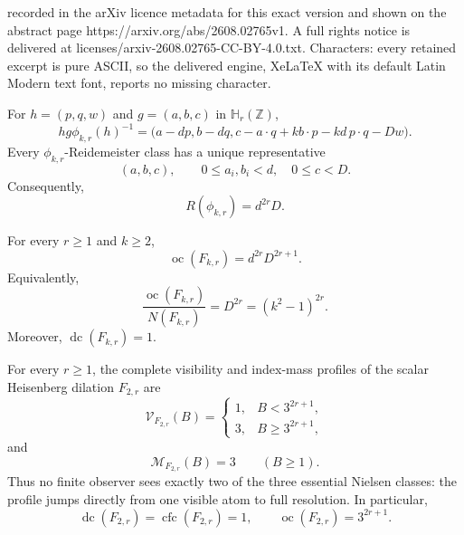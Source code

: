 \documentclass[10pt,a4paper]{amsart}
\DeclareMathOperator{\cfc}{cfc}
\DeclareMathOperator{\dc}{dc}
\DeclareMathOperator{\oc}{oc}
\newcommand{\Heis}{\mathbb H}
\newcommand{\MN}{\mathcal M}
\newcommand{\VN}{\mathcal V}
\newcommand{\Z}{\mathbb Z}
\begin{document}
recorded in the arXiv licence metadata for this exact version and shown on the abstract page https://arxiv.org/abs/2608.02765v1. A full rights notice is delivered at licenses/arxiv-2608.02765-CC-BY-4.0.txt. Characters: every retained excerpt is pure ASCII, so the delivered engine, XeLaTeX with its default Latin Modern text font, reports no missing character.
\begin{lemma}
\label{lem:heisclasses}
For $h=(p,q,w)$ and $g=(a,b,c)$ in $\Heis_r(\Z)$,
\[
 h g\phi_{k,r}(h)^{-1}
 =\bigl(a-dp,b-dq,
 c-a\!\cdot q+k b\!\cdot p-kd\,p\!\cdot q-Dw\bigr).
\]
Every $\phi_{k,r}$-Reidemeister class has a unique representative
\[
  (a,b,c),
  \qquad
  0\le a_i,b_i<d,
  \quad
  0\le c<D.
\]
Consequently,
\[
  R(\phi_{k,r})=d^{2r}D.
\]
\end{lemma}

\begin{theorem}
\label{thm:heisexact}
For every $r\ge1$ and $k\ge2$,
\[
  \boxed{\oc(F_{k,r})=d^{2r}D^{2r+1}.}
\]
Equivalently,
\[
  \frac{\oc(F_{k,r})}{N(F_{k,r})}=D^{2r}=(k^2-1)^{2r}.
\]
Moreover, $\dc(F_{k,r})=1$.
\end{theorem}

\begin{theorem}[All-or-nothing visibility for $k=2$]
\label{thm:heisprofilek2}
For every $r\ge1$, the complete visibility and index-mass profiles of the
scalar Heisenberg dilation $F_{2,r}$ are
\[
  \boxed{
  \VN_{F_{2,r}}(B)=
  \begin{cases}
    1,&B<3^{2r+1},\\[1mm]
    3,&B\ge3^{2r+1},
  \end{cases}}
\]
and
\[
  \MN_{F_{2,r}}(B)=3
  \qquad(B\ge1).
\]
Thus no finite observer sees exactly two of the three essential Nielsen
classes: the profile jumps directly from one visible atom to full resolution.
In particular,
\[
  \dc(F_{2,r})=\cfc(F_{2,r})=1,
  \qquad
  \oc(F_{2,r})=3^{2r+1}.
\]
\end{theorem}
\end{document}
